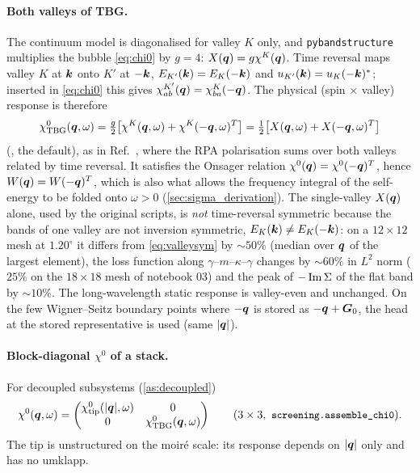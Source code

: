 \paragraph{Both valleys of TBG.}\label{sec:valleys}
The continuum model is diagonalised for valley $K$ only, and \texttt{pybandstructure} multiplies the bubble
\eqref{eq:chi0} by $g=4$: $X(\bm q)=g\chi^K(\bm q)$. Time reversal maps valley $K$ at $\bm k$ onto $K'$ at $-\bm k$,
$E_{K'}(\bm k)=E_K(-\bm k)$ and $u_{K'}(\bm k)=u_K(-\bm k)^*$; inserted in \eqref{eq:chi0} this gives
$\chi^{K'}_{ab}(\bm q)=\chi^{K}_{ba}(-\bm q)$. The physical (spin $\times$ valley) response is therefore
\begin{equation}
\chi^0_{\rm TBG}(\bm q,\omega)=\tfrac{g}{2}\bigl[\chi^K(\bm q,\omega)+\chi^K(-\bm q,\omega)^T\bigr]
=\tfrac12\bigl[X(\bm q,\omega)+X(-\bm q,\omega)^T\bigr]
\label{eq:valleysym}
\end{equation}
(, the default), as in Ref.~\cite{Wei2025}, where the RPA
polarisation sums over both valleys related by time reversal. It satisfies the Onsager relation
$\chi^0(\bm q)=\chi^0(-\bm q)^T$, hence $W(\bm q)=W(-\bm q)^T$, which is also what allows the frequency integral of the
self-energy to be folded onto $\omega>0$ (\cref{sec:sigma_derivation}). The single-valley $X(\bm q)$ alone, used by
the original scripts, is \emph{not} time-reversal symmetric because the bands of one valley are not inversion
symmetric, $E_K(\bm k)\neq E_K(-\bm k)$: on a $12\times12$ mesh at $1.20^\circ$ it differs from
\cref{eq:valleysym} by $\sim50\%$ (median over $\bm q$ of the largest element), the loss function along
$\gamma$--$m$--$\kappa$--$\gamma$ changes by $\sim60\%$ in $L^2$ norm ($25\%$ on the $18\times18$ mesh of
notebook 03) and the peak of $-\operatorname{Im}\Sigma$ of the flat band by $\sim10\%$. The long-wavelength static response is valley-even and unchanged. On the few Wigner--Seitz
boundary points where $-\bm q$ is stored as $-\bm q+\bm G_0$, the head at the stored representative is used (same $|\bm q|$).

\paragraph{Block-diagonal $\chi^0$ of a stack.} For decoupled subsystems (\cref{as:decoupled})
\begin{equation}
\chi^0(\bq,\omega)=\begin{pmatrix}\chi^0_{\rm tip}(|\bq|,\omega)&0\\0&\chi^0_{\rm TBG}(\bq,\omega)\end{pmatrix}
\qquad(3\times3,\ \code{screening.assemble\_chi0}).
\end{equation}
The tip is unstructured on the moir\'e scale: its response depends on $|\bm q|$ only and has no umklapp.

